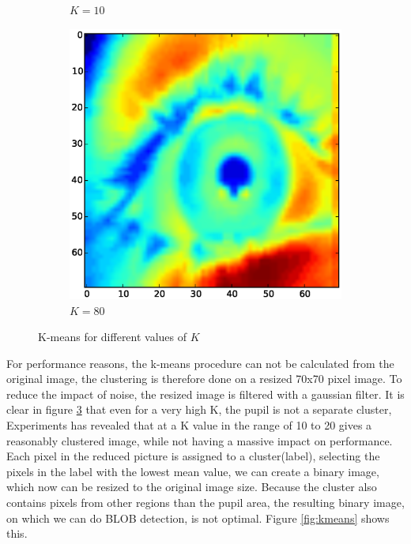 \documentclass[a4paper,11pt]{article}
\begin{document}
\begin{figure}[ht]
\begin{subfigure}{.33\textwidth}
  \caption{$K=10$}
  \label{fig:kmeans_sub2}
\end{subfigure}
\begin{subfigure}{.33\textwidth}
  \centering
  \includegraphics[width=1\linewidth]{kmean_k80_v70}
  \caption{$K=80$}
  \label{fig:kmeans_sub3}
\end{subfigure}
\caption{K-means for different values of $K$}
\label{fig:kmeans_small}
\end{figure}

For performance reasons, the k-means procedure can not be calculated from the original image, the clustering is therefore done on a resized 70x70 pixel image. To reduce the impact of noise, the resized image is filtered with a gaussian filter. It is clear in figure \ref{fig:kmeans_small} that even for a very high K, the pupil is not a separate cluster, Experiments has revealed that at a K value in the range of 10 to 20 gives a reasonably clustered image, while not having a massive impact on performance.\\

Each pixel in the reduced picture is assigned to a cluster(label), selecting the pixels in the label with the lowest mean value, we can create a binary image, which now can be resized to the original image size. Because the cluster also contains pixels from other regions than the pupil area, the resulting binary image, on which we can do BLOB detection, is not optimal. Figure \ref{fig:kmeans} shows this.
\end{document}
